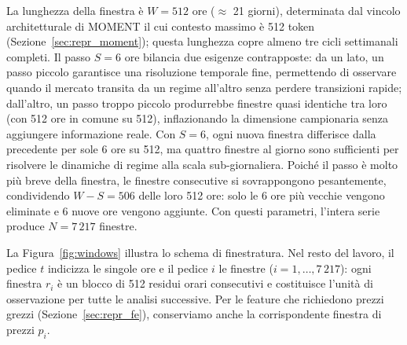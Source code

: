 \documentclass[12pt]{article}
\begin{document}
La lunghezza della finestra è $W = 512$ ore ($\approx$ 21 giorni), determinata dal vincolo architetturale di MOMENT il cui contesto massimo è 512 token (Sezione~\ref{sec:repr_moment}); questa lunghezza copre almeno tre cicli settimanali completi.
Il passo $S = 6$ ore bilancia due esigenze contrapposte: da un lato, un passo piccolo garantisce una risoluzione temporale fine, permettendo di osservare quando il mercato transita da un regime all'altro senza perdere transizioni rapide; dall'altro, un passo troppo piccolo produrrebbe finestre quasi identiche tra loro (con 512 ore in comune su 512), inflazionando la dimensione campionaria senza aggiungere informazione reale.
Con $S = 6$, ogni nuova finestra differisce dalla precedente per sole 6 ore su 512, ma quattro finestre al giorno sono sufficienti per risolvere le dinamiche di regime alla scala sub-giornaliera.
Poiché il passo è molto più breve della finestra, le finestre consecutive si sovrappongono pesantemente, condividendo $W - S = 506$ delle loro 512 ore: solo le 6 ore più vecchie vengono eliminate e 6 nuove ore vengono aggiunte.
Con questi parametri, l'intera serie produce $N = 7\,217$ finestre.

La Figura~\ref{fig:windows} illustra lo schema di finestratura.
Nel resto del lavoro, il pedice $t$ indicizza le singole ore e il pedice $i$ le finestre ($i = 1, \ldots, 7\,217$): ogni finestra $r_i$ è un blocco di 512 residui orari consecutivi e costituisce l'unità di osservazione per tutte le analisi successive.
Per le feature che richiedono prezzi grezzi (Sezione~\ref{sec:repr_fe}), conserviamo anche la corrispondente finestra di prezzi $p_i$.
\end{document}
